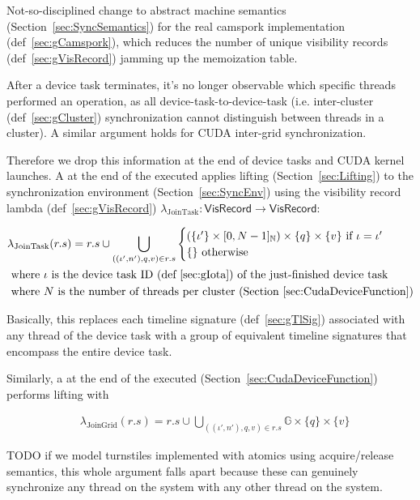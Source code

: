 
Not-so-disciplined change to abstract machine semantics (Section~\ref{sec:SyncSemantics}) for the real camspork implementation (def~\ref{sec:gCamspork}), which reduces the number of unique visibility records (def~\ref{sec:gVisRecord}) jamming up the memoization table.

After a device task terminates, it's no longer observable which specific threads performed an operation, as all device-task-to-device-task (i.e. inter-cluster (def~\ref{sec:gCluster}) synchronization cannot distinguish between threads in a cluster).
A similar argument holds for CUDA inter-grid synchronization.

Therefore we drop this information at the end of device tasks and CUDA kernel launches.
A  at the end of the executed  applies lifting (Section~\ref{sec:Lifting}) to the synchronization environment (Section~\ref{sec:SyncEnv}) using the visibility record lambda (def~\ref{sec:gVisRecord}) $\lambda_\mathrm{JoinTask}: \textsf{VisRecord} \to \textsf{VisRecord}$:

\begin{align*}
    & \lambda_\mathrm{JoinTask}(r.s) = r.s \cup \bigcup_{((\iota', n'), q, v) \in r.s}
      \begin{cases}
        (\{\iota'\} \times [0, N-1]_\mathbb{N}) \times \{q\} \times \{v\} \text{ if $\iota = \iota'$ } \\
        \{\} \text{ otherwise}
      \end{cases} \\
    & \text{ where $\iota$ is the device task ID (def~\ref{sec:gIota}) of the just-finished device task} \\
    & \text{ where $N$ is the number of threads per cluster (Section~\ref{sec:CudaDeviceFunction})} \\
\end{align*}

Basically, this replaces each timeline signature (def~\ref{sec:gTlSig}) associated with any thread of the device task with a group of equivalent timeline signatures that encompass the entire device task.

Similarly, a  at the end of the executed  (Section~\ref{sec:CudaDeviceFunction}) performs lifting with

\begin{align*}
    & \lambda_\mathrm{JoinGrid}(r.s) = r.s \cup \bigcup_{((\iota', n'), q, v) \in r.s}
      \mathbb{G} \times \{q\} \times \{v\}
\end{align*}

TODO if we model turnstiles implemented with atomics using acquire/release semantics, this whole argument falls apart because these can genuinely synchronize any thread on the system with any other thread on the system.
